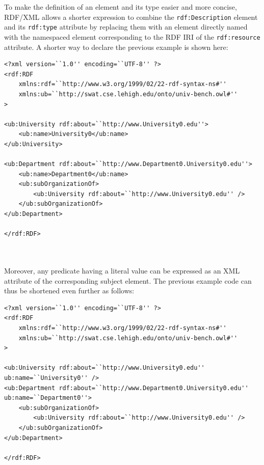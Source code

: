 \documentclass[10pt, a4paper]{report}
\begin{document}
To make the definition of an element and its type easier and more concise, RDF/XML allows a shorter expression to combine the \texttt{rdf:Description} element and its \texttt{rdf:type} attribute by replacing them with an element directly named with the namespaced element corresponding to the RDF IRI of the \texttt{rdf:resource} attribute. A shorter way to declare the previous example is shown here: \\

\begin{minipage}{0.92\textwidth}
	\lstset{language=xml}
	\begin{lstlisting}
<?xml version=``1.0'' encoding=``UTF-8'' ?>
<rdf:RDF
    xmlns:rdf=``http://www.w3.org/1999/02/22-rdf-syntax-ns#''
    xmlns:ub=``http://swat.cse.lehigh.edu/onto/univ-bench.owl#''
> 

<ub:University rdf:about=``http://www.University0.edu''>
    <ub:name>University0</ub:name>
</ub:University>

<ub:Department rdf:about=``http://www.Department0.University0.edu''>
    <ub:name>Department0</ub:name>
    <ub:subOrganizationOf>
        <ub:University rdf:about=``http://www.University0.edu'' />
    </ub:subOrganizationOf>
</ub:Department>

</rdf:RDF>
                \end{lstlisting}
\end{minipage} \\
\\

Moreover, any predicate having a literal value can be expressed as an XML attribute of the corresponding subject element. The previous example code can thus be shortened even further as follows: \\

\begin{minipage}{0.92\textwidth}
	\lstset{language=xml}
	\begin{lstlisting}
<?xml version=``1.0'' encoding=``UTF-8'' ?>
<rdf:RDF
    xmlns:rdf=``http://www.w3.org/1999/02/22-rdf-syntax-ns#''
    xmlns:ub=``http://swat.cse.lehigh.edu/onto/univ-bench.owl#''
> 

<ub:University rdf:about=``http://www.University0.edu'' ub:name=``University0'' />
<ub:Department rdf:about=``http://www.Department0.University0.edu'' ub:name=``Department0''>
    <ub:subOrganizationOf>
        <ub:University rdf:about=``http://www.University0.edu'' />
    </ub:subOrganizationOf>
</ub:Department>

</rdf:RDF>
                \end{lstlisting}
\end{minipage} \\
\\
\end{document}
